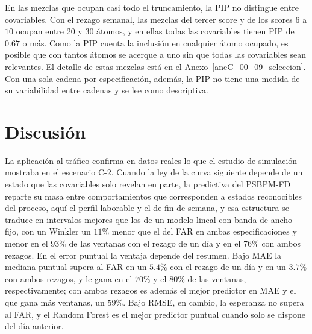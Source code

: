 En las mezclas que ocupan casi todo el truncamiento, la PIP no distingue entre covariables. Con el rezago semanal, las mezclas del tercer score y de los scores $6$ a $10$ ocupan entre 20 y 30 átomos, y en ellas todas las covariables tienen PIP de $0.67$ o más. Como la PIP cuenta la inclusión en cualquier átomo ocupado, es posible que con tantos átomos se acerque a uno sin que todas las covariables sean relevantes. El detalle de estas mezclas está en el Anexo~\ref{aneC_00_09_seleccion}. Con una sola cadena por especificación, además, la PIP no tiene una medida de su variabilidad entre cadenas y se lee como descriptiva.
\section{Discusión}
\label{04_04_00_discusion}

La aplicación al tráfico confirma en datos reales lo que el estudio de simulación mostraba en el escenario C-2. Cuando la ley de la curva siguiente depende de un estado que las covariables solo revelan en parte, la predictiva del PSBPM-FD reparte su masa entre comportamientos que corresponden a estados reconocibles del proceso, aquí el perfil laborable y el de fin de semana, y esa estructura se traduce en intervalos mejores que los de un modelo lineal con banda de ancho fijo, con un Winkler un $11\%$ menor que el del FAR en ambas especificaciones y menor en el $93\%$ de las ventanas con el rezago de un día y en el $76\%$ con ambos rezagos. En el error puntual la ventaja depende del resumen. Bajo MAE la mediana puntual supera al FAR en un $5.4\%$ con el rezago de un día y en un $3.7\%$ con ambos rezagos, y le gana en el $70\%$ y el $80\%$ de las ventanas, respectivamente; con ambos rezagos es además el mejor predictor en MAE y el que gana más ventanas, un $59\%$. Bajo RMSE, en cambio, la esperanza no supera al FAR, y el Random Forest es el mejor predictor puntual cuando solo se dispone del día anterior.\\

